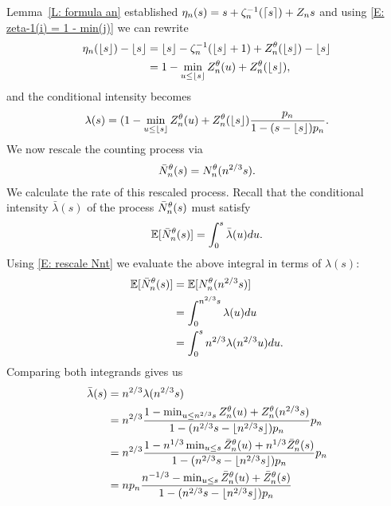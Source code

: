 Lemma~\ref{L: formula an} established $\eta_n(s) = s + \zeta^{-1}_n(\lceil s\rceil) + Z_n{s}$ 
and using \eqref{E: zeta-1(i) = 1 - min(j)} we can rewrite
\begin{equation*}
\begin{aligned}
\eta_n(\lfloor s\rfloor) - \lfloor s\rfloor 
&= \lfloor s\rfloor - \zeta^{-1}_n(\lfloor s\rfloor+1) + Z_n^{\theta}(\lfloor s\rfloor) - \lfloor s\rfloor \\
&= 1 - \min_{u \leq \lfloor s\rfloor} Z_n^{\theta}(u) + Z_n^{\theta}(\lfloor s\rfloor),
\end{aligned}
\end{equation*}
and the conditional intensity becomes
\begin{equation} \label{E: rate Nnt 2}
\lambda(s) = (1 - \min_{u \leq \lfloor s\rfloor} Z_n^{\theta}(u) + Z_n^{\theta}(\lfloor s\rfloor) \frac{p_n}{1-(s-\lfloor s\rfloor)p_n}.
\end{equation}
We now rescale the counting process via
\begin{equation} \label{E: rescale Nnt}
\bar{N}_n^{\theta}(s) = N_n^{\theta}(n^{2 / 3}s).
\end{equation}
We calculate the rate of this rescaled process.
Recall that the conditional intensity $\bar{\lambda}(s)$ of the process $\bar{N}_n^{\theta}(s)$ must satisfy
\begin{equation}
\mathbb{E}[\bar{N}_n^{\theta}(s)] = \int_{0}^{s} \bar{\lambda}(u) du.
\end{equation}
Using \eqref{E: rescale Nnt} we evaluate the above integral in terms of $\lambda(s)$:
\begin{equation*}
\begin{aligned}
\mathbb{E}[\bar{N}_n^{\theta}(s)]
&= \mathbb{E}[N_n^{\theta}(n^{2 / 3}s)] \\
&= \int_{0}^{n^{2 / 3}s} \lambda(u) du \\
&= \int_{0}^{s} n^{2 / 3} \lambda(n^{2 / 3}u) du.
\end{aligned}
\end{equation*}
Comparing both integrands gives us
\begin{equation} \label{E: conditional intensity final}
\begin{aligned}
\bar{\lambda}(s)
&= n^{2 / 3} \lambda(n^{2 / 3}s) \\
&= n^{2 / 3} \frac{1 - \min_{u \leq n^{2 / 3}s} Z_n^{\theta}(u) + Z_n^{\theta}(n^{2 / 3}s)}{1 - (n^{2 / 3}s - \lfloor n^{2 / 3}s\rfloor)p_n} p_n \\
&= n^{2 / 3} \frac{1 - n^{1 / 3} \min_{u \leq s} \bar{Z}^{\theta}_n(u) + n^{1 / 3}\bar{Z}^{\theta}_n(s)}{1 - (n^{2 / 3}s - \lfloor n^{2 / 3}s\rfloor)p_n} p_n \\
&= n p_n \frac{n^{-1 / 3} - \min_{u \leq s} \bar{Z}^{\theta}_n(u) + \bar{Z}^{\theta}_n(s)}{1 - (n^{2 / 3}s - \lfloor n^{2 / 3}s\rfloor)p_n}
\end{aligned}
\end{equation}

